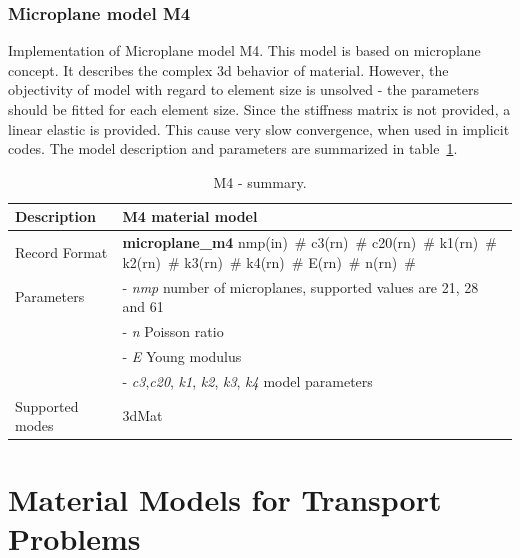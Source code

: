 \documentclass[epsf,a4paper]{article}
\newcommand{\descitem}[1]{{\noindent \bf #1}}
\newcommand{\elemparam}[2]{{{#1\tiny (#2)}~\#}}
\newcommand{\param}[1]{{\it #1}}
\begin{document}
\subsubsection{Microplane model M4}
Implementation of Microplane model M4.
This model is based on microplane concept. It describes the complex 3d
behavior of material. However, the objectivity of model with regard
to element size is unsolved - the parameters should be fitted for each
element size. Since the stiffness matrix is not provided, a linear
elastic is provided. This cause very slow convergence, when used in
implicit codes. 
The model description and parameters are summarized
in table~\ref{m4_table}.

\begin{table}[h]                                                                
\begin{tabular}{|l|p{9cm}|}                                                      
\hline                                                                          
Description & M4 material model\\
\hline                                                                          
Record Format & \descitem{microplane\_m4}  \elemparam{nmp}{in}
\elemparam{c3}{rn} \elemparam{c20}{rn} \elemparam{k1}{rn} 
\elemparam{k2}{rn} \elemparam{k3}{rn} \elemparam{k4}{rn}
\elemparam{E}{rn} \elemparam{n}{rn} \\
Parameters &- \param{nmp} number of microplanes, supported values are
21, 28 and 61\\
&- \param{n} Poisson ratio\\
&- \param{E} Young modulus \\
&- \param{c3},\param{c20}, \param{k1}, \param{k2}, \param{k3},
\param{k4}  model parameters\\
Supported modes& 3dMat\\
\hline
\end{tabular}                                                                   
\caption{M4  - summary.}                
\label{m4_table}                                                         
\end{table}                                                                     

\clearpage
\section{Material Models for Transport Problems}
\end{document}

